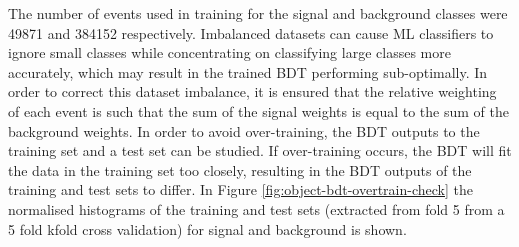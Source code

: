The number of events used in training for the signal and background classes were 49871 and 384152 respectively. Imbalanced datasets can cause ML classifiers to ignore small classes while concentrating on classifying large classes more accurately, which may result in the trained BDT performing sub-optimally. In order to correct this dataset imbalance, it is ensured that the relative weighting of each event is such that the sum of the signal weights is equal to the sum of the background weights. In order to avoid over-training, the BDT outputs to the training set and a test set can be studied. If over-training occurs, the BDT will fit the data in the training set too closely, resulting in the BDT outputs of the training and test sets to differ. In Figure \ref{fig:object-bdt-overtrain-check} the normalised histograms of the training and test sets (extracted from fold 5 from a 5 fold kfold cross validation) for signal and background is shown.

